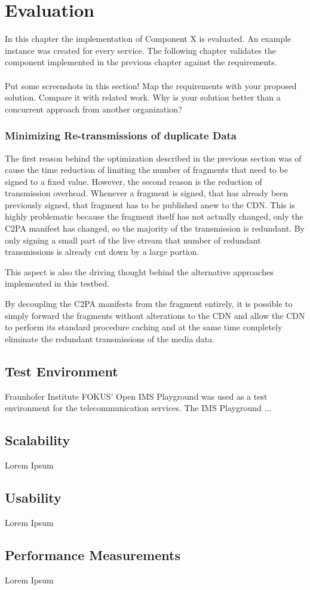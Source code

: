 \chapter{Evaluation\label{cha:chapter6}}

In this chapter the implementation of Component X is evaluated. An example instance was created for every service. The following chapter validates the component implemented in the previous chapter against the requirements.
\\
\\
Put some screenshots in this section! Map the requirements with your proposed solution. Compare it with related work. Why is your solution better than a concurrent approach from another organization?


\subsection{Minimizing Re-transmissions of duplicate Data}

The first reason behind the optimization described in the previous section was of cause the time reduction of limiting the number of fragments that need to be signed to a fixed value. However, the second reason is the reduction of transmission overhead. Whenever a fragment is signed, that has already been previously signed, that fragment has to be published anew to the CDN. This is highly problematic because the fragment itself has not actually changed, only the C2PA manifest has changed, so the majority of the transmission is redundant. By only signing a small part of the live stream that number of redundant transmissions is already cut down by a large portion.

This aspect is also the driving thought behind the alternative approaches implemented in this testbed.

By decoupling the C2PA manifests from the fragment entirely, it is possible to simply forward the fragments without alterations to the CDN and allow the CDN to perform its standard procedure caching and at the same time completely eliminate the redundant transmissions of the media data.

\section{Test Environment\label{sec:testenvir}}

Fraunhofer Institute FOKUS' Open IMS Playground was used as a test environment for the telecommunication services. The IMS Playground ...

\section{Scalability\label{sec:scal}}

Lorem Ipsum

\section{Usability\label{sec:usab}}

Lorem Ipsum

\section{Performance Measurements\label{sec:performance}}

Lorem Ipsum